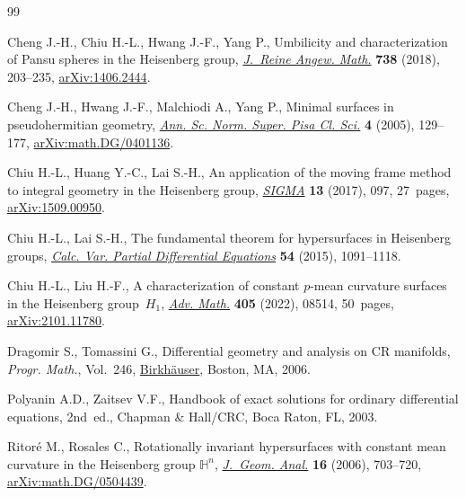 \begin{thebibliography}{99}
\footnotesize\itemsep=0pt

Cheng J.-H., Chiu H.-L., Hwang J.-F., Yang P., Umbilicity and characterization of
 {P}ansu spheres in the {H}eisenberg group, \href{https://doi.org/10.1515/crelle-2015-0044}{\textit{J.~Reine Angew. Math.}}
 \textbf{738} (2018), 203--235, \href{https://arxiv.org/abs/1406.2444}{arXiv:1406.2444}.

Cheng J.-H., Hwang J.-F., Malchiodi A., Yang P., Minimal surfaces in
 pseudohermitian geometry, \href{http://www.numdam.org/item/ASNSP_2005_5_4_1_129_0/}{\textit{Ann. Sc. Norm. Super. Pisa Cl. Sci.}}
 \textbf{4} (2005), 129--177, \href{https://arxiv.org/abs/math.DG/0401136}{arXiv:math.DG/0401136}.

Chiu H.-L., Huang Y.-C., Lai S.-H., An application of the moving frame method to
 integral geometry in the {H}eisenberg group, \href{https://doi.org/10.3842/SIGMA.2017.097}{\textit{SIGMA}} \textbf{13}
 (2017), 097, 27~pages, \href{https://arxiv.org/abs/1509.00950}{arXiv:1509.00950}.

Chiu H.-L., Lai S.-H., The fundamental theorem for hypersurfaces in {H}eisenberg
 groups, \href{https://doi.org/10.1007/s00526-015-0818-1}{\textit{Calc. Var. Partial Differential Equations}} \textbf{54}
 (2015), 1091--1118.

Chiu H.-L., Liu H.-F., A characterization of constant {$p$}-mean curvature
 surfaces in the {H}eisenberg group~{$H_1$}, \href{https://doi.org/10.1016/j.aim.2022.108514}{\textit{Adv. Math.}} \textbf{405}
 (2022), 08514, 50~pages, \href{https://arxiv.org/abs/2101.11780}{arXiv:2101.11780}.

Dragomir S., Tomassini G., Differential geometry and analysis on {CR}
 manifolds, \textit{Progr. Math.}, Vol.~246, \href{https://doi.org/10.1007/0-8176-4483-0}{Birkh\"auser}, Boston, MA, 2006.

Polyanin A.D., Zaitsev V.F., Handbook of exact solutions for ordinary
 differential equations, 2nd~ed., Chapman \& Hall/CRC, Boca Raton, FL, 2003.

Ritor\'e M., Rosales C., Rotationally invariant hypersurfaces with constant
 mean curvature in the {H}eisenberg group {$\mathbb H^n$}, \href{https://doi.org/10.1007/BF02922137}{\textit{J.~Geom.
 Anal.}} \textbf{16} (2006), 703--720, \href{https://arxiv.org/abs/math.DG/0504439}{arXiv:math.DG/0504439}.

\end{thebibliography}
